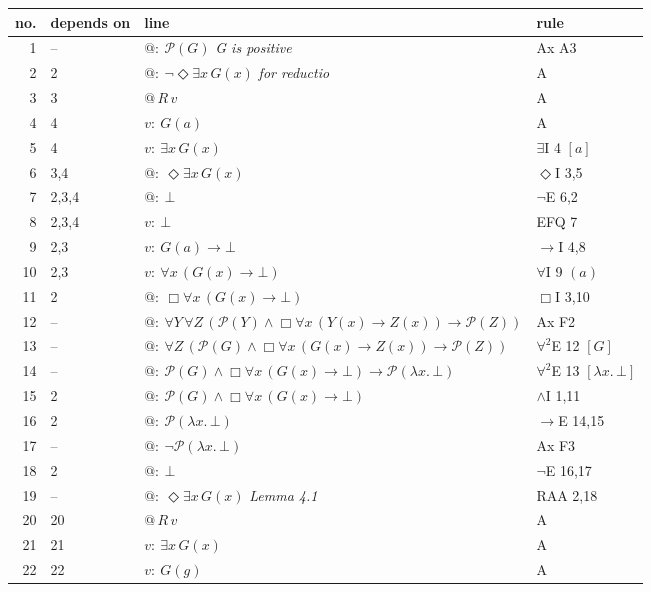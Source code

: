 {\footnotesize\setlength{\tabcolsep}{4pt}
\begin{longtable}{@{}r>{\raggedright}p{}p{}>{\raggedright\arraybackslash}p{}@{}}\toprule
no. & depends on & line & rule\\\midrule\endhead
1 & -- & $@:\ \mathcal{P}(G)$ \hfill{\itshape G is positive} & Ax A3\\
2 & 2 & $@:\ \neg \Diamond \exists x\, G(x)$ \hfill{\itshape for reductio} & A\\
3 & 3 & $@\,R\,v$ & A\\
4 & 4 & $v:\ G(a)$ & A\\
5 & 4 & $v:\ \exists x\, G(x)$ & $\exists$I 4 $[a]$\\
6 & 3,4 & $@:\ \Diamond \exists x\, G(x)$ & $\Diamond$I 3,5\\
7 & 2,3,4 & $@:\ \bot$ & $\neg$E 6,2\\
8 & 2,3,4 & $v:\ \bot$ & EFQ 7\\
9 & 2,3 & $v:\ G(a) \to \bot$ & $\to$I 4,8\\
10 & 2,3 & $v:\ \forall x\, (G(x) \to \bot)$ & $\forall$I 9 $(a)$\\
11 & 2 & $@:\ \Box \forall x\, (G(x) \to \bot)$ & $\Box$I 3,10\\
12 & -- & $@:\ \forall Y\, \forall Z\, (\mathcal{P}(Y) \wedge \Box \forall x\, (Y(x) \to Z(x)) \to \mathcal{P}(Z))$ & Ax F2\\
13 & -- & $@:\ \forall Z\, (\mathcal{P}(G) \wedge \Box \forall x\, (G(x) \to Z(x)) \to \mathcal{P}(Z))$ & $\forall^2$E 12 $[G]$\\
14 & -- & $@:\ \mathcal{P}(G) \wedge \Box \forall x\, (G(x) \to \bot) \to \mathcal{P}(\lambda x.\,\bot)$ & $\forall^2$E 13 $[\lambda x.\,\bot]$\\
15 & 2 & $@:\ \mathcal{P}(G) \wedge \Box \forall x\, (G(x) \to \bot)$ & $\wedge$I 1,11\\
16 & 2 & $@:\ \mathcal{P}(\lambda x.\,\bot)$ & $\to$E 14,15\\
17 & -- & $@:\ \neg \mathcal{P}(\lambda x.\,\bot)$ & Ax F3\\
18 & 2 & $@:\ \bot$ & $\neg$E 16,17\\
19 & -- & $@:\ \Diamond \exists x\, G(x)$ \hfill{\itshape Lemma 4.1} & RAA 2,18\\
20 & 20 & $@\,R\,v$ & A\\
21 & 21 & $v:\ \exists x\, G(x)$ & A\\
22 & 22 & $v:\ G(g)$ & A\\

\end{longtable}}
